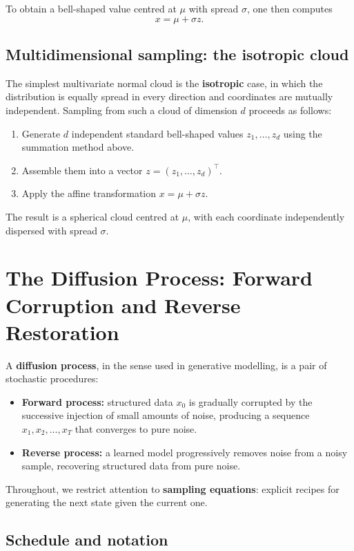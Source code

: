 \documentclass[11pt]{article}
\begin{document}
\noindent
To obtain a bell-shaped value centred at $\mu$ with spread $\sigma$, one then computes
\[
  x = \mu + \sigma z.
\]

\subsection*{Multidimensional sampling: the isotropic cloud}

The simplest multivariate normal cloud is the \textbf{isotropic} case, in which the distribution is equally spread in every direction and coordinates are mutually independent.
Sampling from such a cloud of dimension $d$ proceeds as follows:
\begin{enumerate}
  \item Generate $d$ independent standard bell-shaped values $z_1, \ldots, z_d$ using the summation method above.
  \item Assemble them into a vector $z = (z_1, \ldots, z_d)^\top$.
  \item Apply the affine transformation $x = \mu + \sigma z$.
\end{enumerate}
The result is a spherical cloud centred at $\mu$, with each coordinate independently dispersed with spread $\sigma$.

\section{The Diffusion Process: Forward Corruption and Reverse Restoration}

A \textbf{diffusion process}, in the sense used in generative modelling, is a pair of stochastic procedures:
\begin{itemize}
  \item \textbf{Forward process:} structured data $x_0$ is gradually corrupted by the successive injection of small amounts of noise, producing a sequence $x_1, x_2, \ldots, x_T$ that converges to pure noise.
  \item \textbf{Reverse process:} a learned model progressively removes noise from a noisy sample, recovering structured data from pure noise.
\end{itemize}

Throughout, we restrict attention to \textbf{sampling equations}: explicit recipes for generating the next state given the current one.

\subsection*{Schedule and notation}
\end{document}
